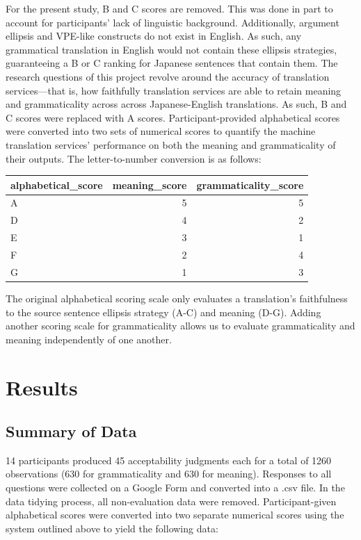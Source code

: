 \documentclass[
  man,floatsintext]{apa6}
\begin{document}
For the present study, B and C scores are removed. This was done in part to account for participants' lack of linguistic background. Additionally, argument ellipsis and VPE-like constructs do not exist in English. As such, any grammatical translation in English would not contain these ellipsis strategies, guaranteeing a B or C ranking for Japanese sentences that contain them. The research questions of this project revolve around the accuracy of translation services---that is, how faithfully translation services are able to retain meaning and grammaticality across across Japanese-English translations. As such, B and C scores were replaced with A scores.
Participant-provided alphabetical scores were converted into two sets of numerical scores to quantify the machine translation services' performance on both the meaning and grammaticality of their outputs. The letter-to-number conversion is as follows:

\begin{tabular}{l|r|r}
\hline
alphabetical\_score & meaning\_score & grammaticality\_score\\
\hline
A & 5 & 5\\
\hline
D & 4 & 2\\
\hline
E & 3 & 1\\
\hline
F & 2 & 4\\
\hline
G & 1 & 3\\
\hline
\end{tabular}

The original alphabetical scoring scale only evaluates a translation's faithfulness to the source sentence ellipsis strategy (A-C) and meaning (D-G). Adding another scoring scale for grammaticality allows us to evaluate grammaticality and meaning independently of one another.

\hypertarget{results}{%
\section{Results}\label{results}}

\hypertarget{summary-of-data}{%
\subsection{Summary of Data}\label{summary-of-data}}

14 participants produced 45 acceptability judgments each for a total of 1260 observations (630 for grammaticality and 630 for meaning). Responses to all questions were collected on a Google Form and converted into a .csv file. In the data tidying process, all non-evaluation data were removed. Participant-given alphabetical scores were converted into two separate numerical scores using the system outlined above to yield the following data:
\end{document}
